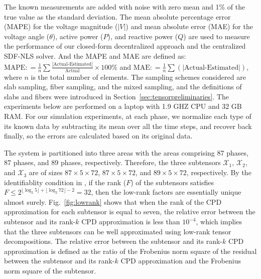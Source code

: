 \documentclass[journal]{IEEEtran}
\newcounter{define}
\newcommand{\floor}[1]{\lfloor \log_2{#1}\rfloor}
\newcommand{\revision}[1]{{\color{black} #1}} %
\newcommand{\rev}[1]{{\color{black} #1}} %
\begin{document}
The known measurements are added with noise with zero mean and 1\% of the true value as the  standard deviation.  The  mean absolute percentage error (MAPE) for the voltage magnitude ($|V|$) and mean absolute error (MAE) for the voltage angle ($\theta$), active power ($P$), and reactive power ($Q$) are used to measure the performance of our closed-form decentralized approach and the centralized SDF-NLS solver. \revision{And the MAPE and MAE are defined as:
$\text{MAPE}: = \frac{1}{n}\sum\frac{|\text{Actual-Estimated}|}{\text{Actual}}\times 100\%$ and $\text{MAE}: = \frac{1}{n}\sum(|\text{Actual-Estimated}|)$, where $n$ is the total number of elements. } The sampling schemes considered are slab sampling, fiber sampling, and the mixed sampling, and the definitions of slabs and fibers were introduced in Section~\ref{sec:tensorpreliminaries}. \revision{The experiments below are performed on a laptop with 1.9 GHZ CPU and 32 GB RAM. \rev{For our simulation experiments, at each phase, we normalize each type of its known data by subtracting its mean over
all the time steps, and recover back finally, so the errors are calculated based on its original data.}}

The system is partitioned into three areas with the areas comprising 87 phases, 87 phases, and 89 phases, respectively. Therefore, the three subtensors $\mathcal{X}_1$, $\mathcal{X}_2$, and $\mathcal{X}_3$ are of sizes $87\times 5\times 72$, $87\times 5\times 72$, and $89\times 5\times 72$, respectively. By the identifiablity condition
in \cite{Chiantini2012}, if the rank ($F$) of the subtensors satisfies $F\leq 2^{\floor{5}+\floor{72}-2}=32$, then the low-rank factors are essentially unique almost surely.
Fig.~\ref{fig:lowrank} shows that when the rank of the CPD approximation for each subtensor is equal to seven, the relative error between the subtensor  and  its  rank-$k$ CPD approximation is  less than $10^{-4}$, which implies that the three  subtensors can be well approximated using low-rank tensor decompositions. The relative error between  the  subtensor  and  its  rank-$k$ CPD approximation is  defined as the ratio of the Frobenius norm square of the residual between the subtensor and its rank-$k$ CPD approximation and the Frobenius norm square of the subtensor.
\end{document}
